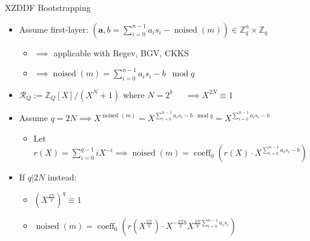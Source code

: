 \documentclass[aspectratio=169]{beamer}
\begin{document}
\begin{frame}{XZDDF Bootstrapping}
    \begin{itemize}
        \item Assume first-layer: \;\; $(\mathbf{a}, b=\sum_{i=0}^{n-1}a_is_i - \operatorname{noised}(m)) \in \mathbb{Z}_q^n \times \mathbb{Z}_q$
        \begin{itemize}
            \item $\implies$ applicable with Regev, BGV, CKKS
            \item $\implies \operatorname{noised}(m) = \sum_{i=0}^{n-1}a_is_i -b \operatorname{\;\;mod} q$
        \end{itemize}        
    \end{itemize}

    \begin{itemize}
        \item $\mathcal{R}_Q := \mathbb{Z}_Q[X] / (X^N + 1)$ where $ N = 2^k \;\;\;\;\; \implies X^{2N} \equiv 1$ %
    \end{itemize}
    
    \begin{itemize}
        \item Assume $q = 2N \implies X^{\operatorname{noised}(m)} = X^{\sum_{i=0}^{n-1}a_is_i -b \operatorname{\;\;mod} q} = X^{\sum_{i=0}^{n-1}a_is_i - b}$
        \begin{itemize}
            \item Let $r(X) = \sum_{i=0}^{q-1} iX^{-i} \implies \operatorname{noised}(m) = \operatorname{coeff}_0 \left(r(X) \cdot X^{\sum_{i=0}^{n-1}a_is_i - b}\right)$
        \end{itemize}
    \end{itemize}

    \begin{itemize}
        \item If $q|2N$ instead:
        \begin{itemize}
            \item $\left(X^{\frac{2N}{q}}\right)^q \equiv 1$
            \item $\operatorname{noised}(m) = \operatorname{coeff}_0 \left(r(X^{\frac{2N}{q}}) \cdot X^{-\frac{2N}{q}b} X^{\frac{2N}{q}\sum_{i=0}^{n-1}a_is_i}\right)$
        \end{itemize}
    \end{itemize}
\end{frame}
\end{document}
